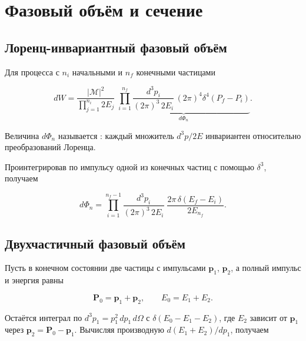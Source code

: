 \documentclass[../final.tex]{subfiles}
\begin{document}
\section{Фазовый объём и сечение}

\subsection{Лоренц-инвариантный фазовый объём}

Для процесса с $n_i$ начальными и $n_f$ конечными частицами

\begin{equation*}
    dW
    =
    \frac{|\mathcal M|^2}{\displaystyle\prod_{j=1}^{n_i}2E_j}\;
    \underbrace{
        \prod_{i=1}^{n_f}
        \frac{d^3p_i}{(2\pi)^3\,2E_i}\,
        (2\pi)^4\delta^4(P_f-P_i)
    }_{d\Phi_n}.
\end{equation*}

Величина $d\Phi_n$ называется
: каждый множитель
$d^3p/2E$ инвариантен относительно преобразований Лоренца.

Проинтегрировав по импульсу одной из конечных частиц
с помощью $\delta^3$, получаем

\begin{equation*}
    d\Phi_n
    =
    \prod_{i=1}^{n_f-1}
    \frac{d^3p_i}{(2\pi)^3\,2E_i}\;
    \frac{2\pi\,\delta(E_f-E_i)}{2E_{n_f}}.
\end{equation*}


\subsection{Двухчастичный фазовый объём}

Пусть в конечном состоянии две частицы с импульсами
$\mathbf p_1$, $\mathbf p_2$, а полный импульс и энергия равны

\begin{equation*}
    \mathbf P_0=\mathbf p_1+\mathbf p_2,
    \qquad
    E_0=E_1+E_2.
\end{equation*}

Остаётся интеграл по $d^3p_1=p_1^2\,dp_1\,d\Omega$ с
$\delta(E_0-E_1-E_2)$, где $E_2$ зависит от $\mathbf p_1$ через
$\mathbf p_2=\mathbf P_0-\mathbf p_1$. Вычисляя производную
$d(E_1+E_2)/dp_1$, получаем
\end{document}
